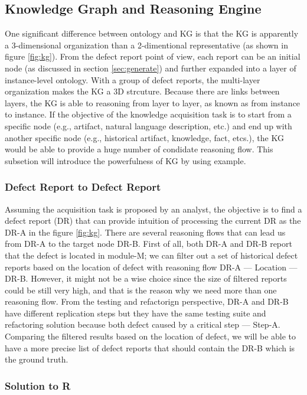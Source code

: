 \documentclass[12pt] {article}
\begin{document}
\subsection{Knowledge Graph and Reasoning Engine}\label{sec:reasoning}
One significant difference between ontology and KG is that the KG is apparently a 3-dimensional organization than a 2-dimentional representative (as shown in figure \ref{fig:kg}).
From the defect report point of view, each report can be an initial node (as discussed in section \ref{sec:generate}) and further expanded into a layer of instance-level ontology. 
With a group of defect reports, the multi-layer organization makes the KG a 3D strcuture.
Because there are links between layers, the KG is able to reasoning from layer to layer, as known as from instance to instance.
If the objective of the knowledge acquisition task is to start from a specific node (e.g., artifact, natural language description, etc.) and end up with another specific node (e.g., historical artifact, knowledge, fact, etcs.), the KG would be able to provide a huge number of condidate reasoning flow.
This subsetion will introduce the powerfulness of KG by using example.
\subsubsection{Defect Report to Defect Report}
Assuming the acquisition task is proposed by an analyst, the objective is to find a defect report (DR) that can provide intuition of processing the current DR as the DR-A in the figure \ref{fig:kg}.
There are several reasoning flows that can lead us from DR-A to the target node DR-B.
First of all, both DR-A and DR-B report that the defect is located in module-M; we can filter out a set of historical defect reports based on the location of defect with reasoning flow DR-A --- Location --- DR-B. 
However, it might not be a wise choice since the size of filtered reports could be still very high, and that is the reason why we need more than one reasoning flow.
From the testing and refactorign perspective, DR-A and DR-B have different replication steps but they have the same testing suite and refactoring solution because both defect caused by a critical step --- Step-A.
Comparing the filtered results based on the location of defect, we will be able to have a more precise list of defect reports that should contain the DR-B which is the ground truth.
\subsubsection{Solution to R}
\end{document}
